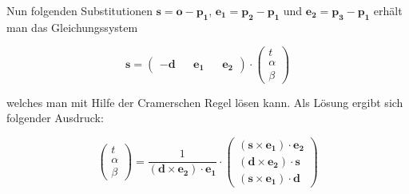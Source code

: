 Nun folgenden Substitutionen $\mathbf{s = o - p_1}$, $\mathbf{e_1 = p_2 - p_1}$ und 
$\mathbf{e_2 = p_3 - p_1}$ erhält man das Gleichungssystem

\begin{equation*}
    \mathbf{s} = \begin{pmatrix} \mathbf{-d} && \mathbf{e_1} && \mathbf{e_2} \end{pmatrix} \cdot
    \begin{pmatrix} \mathit{t} \\ \mathit{\alpha} \\ \mathit{\beta} \end{pmatrix}
\end{equation*}

welches man mit Hilfe der Cramerschen Regel lösen kann.
Als Lösung ergibt sich folgender Ausdruck:

\begin{equation}
    \begin{pmatrix} \mathit{t} \\ \mathit{\alpha} \\ \mathit{\beta} \end{pmatrix} =
    \frac{1}{(\mathbf{d \times e_2}) \cdot \mathbf{e_1}} \cdot
    \begin{pmatrix}
        (\mathbf{s \times e_1}) \cdot \mathbf{e_2}\\
        (\mathbf{d \times e_2}) \cdot \mathbf{s}\\
        (\mathbf{s \times e_1}) \cdot \mathbf{d}
    \end{pmatrix}
    \label{eq_tri_result}
\end{equation}